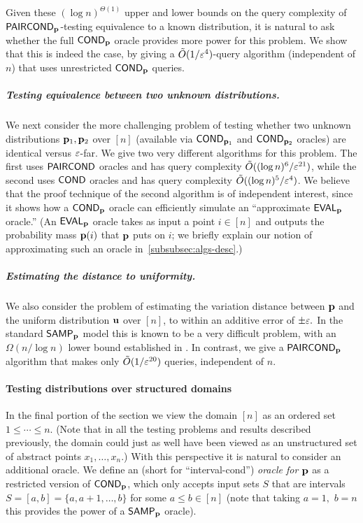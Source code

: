 Given these $(\log n)^{\Theta(1)}$
upper and lower bounds on the query complexity of
${\sf PAIRCOND}_{\mathbf{p}}$-testing equivalence to a known distribution, it is natural to
ask whether the full ${\sf COND}_{\mathbf{p}}$ oracle provides more power for this problem.
We show that this is indeed the case, by giving a
$\tilde{O}(1/\varepsilon^4)$-query algorithm
(independent of $n$) that uses unrestricted ${\sf COND}_{\mathbf{p}}$ queries.

\subparagraph{Testing equivalence between two unknown distributions.}
We next consider the more challenging problem of testing whether two unknown
distributions $\mathbf{p}_1,\mathbf{p}_2$ over $[n]$ (available via ${\sf COND}_{\mathbf{p}_1}$
and ${\sf COND}_{\mathbf{p}_2}$ oracles) are identical versus $\varepsilon$-far.
We give two very different algorithms for this problem.  The first uses
${\sf PAIRCOND}$ oracles and has query complexity
$\tilde{O}((\log n)^6/\varepsilon^{21})$, while the second
uses ${\sf COND}$ oracles and has query complexity
{$\tilde{O}((\log n)^5/\varepsilon^4)$.}
We {believe} that the proof technique of the second algorithm is of independent
interest, since it shows how a ${\sf COND}_{\mathbf{p}}$ oracle can efficiently simulate
an ``approximate ${\sf EVAL}_{\mathbf{p}}$ oracle.''  (An ${\sf EVAL}_{\mathbf{p}}$ oracle takes as input a
point $i \in [n]$ and outputs the probability mass $\mathbf{p}(i)$ that $\mathbf{p}$
puts on $i$; {we briefly explain our notion of approximating
such an oracle in~\cref{subsubsec:algs-desc}}.)

\subparagraph{Estimating the distance to uniformity.}  We also consider the problem of
estimating {the variation distance} between $\mathbf{p}$ and
the uniform distribution $\mathbf{u}$ over $[n]$, to within an additive error of
$\pm \varepsilon.$  In the standard ${\sf SAMP}_{\mathbf{p}}$ model this is known to be a very
difficult problem, with an $\Omega(n/\log n)$ lower bound established in
{\cite{ValiantValiant:11,ValiantValiant:10lb}}.  In contrast, we give a
${\sf PAIRCOND}_{\mathbf{p}}$ algorithm that makes only $\tilde{O}(1/\varepsilon^{20})$
queries, independent of $n$.


\paragraph{Testing distributions over structured domains}
In the final portion of the section we view the domain $[n]$ as an ordered
set $1 \leq \cdots \leq n$.  (Note that in all the testing problems and results
described previously, the domain could just as well have been viewed
as an unstructured set of abstract points $x_1,\dots,x_n$.)  With this
perspective it is natural to consider an additional oracle.
We define an \emph{\ICOND} (short for ``interval-cond'')
\emph{oracle for $\mathbf{p}$} as a restricted version
of ${\sf COND}_{\mathbf{p}}$, which only accepts input sets $S$ that are intervals
$S=[a,b]=\{a,a+1,\dots,b\}$ for some $a \leq b \in [n]$ (note that
taking $a=1,$ $b=n$ this provides the power of a ${\sf SAMP}_{\mathbf{p}}$ oracle).

